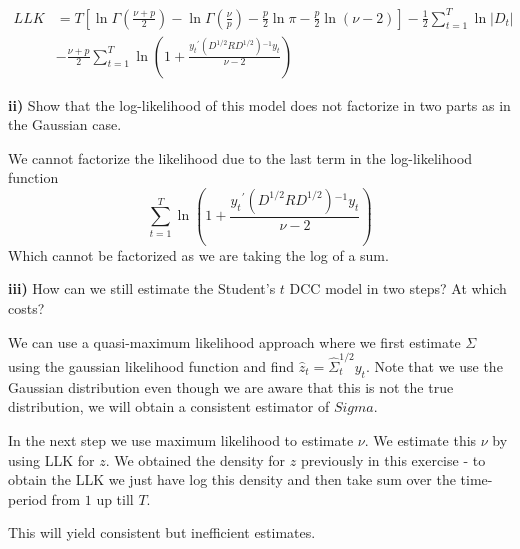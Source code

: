 \documentclass{article}
\begin{document}
\begin{align*}
    LLK&=T\left[\ln\Gamma\left(\frac{\nu+p}{2}\right)-\ln\Gamma\left(\frac{\nu}{p}\right)-\frac{p}{2}\ln\pi-\frac{p}{2}\ln\left(\nu-2\right)\right]-\frac{1}{2}\sum_{t=1}^{T}\ln\left|D_{t}\right|\\
	&-\frac{\nu+p}{2}\sum_{t=1}^{T}\ln\left(1+\frac{y_{t}{}^{\prime}\left(D^{1/2}RD^{1/2}\right){}^{-1}y_{t}}{\nu-2}\right)
\end{align*}

\begin{tcolorbox}[colback=white]
	\textbf{ii)} Show that the log-likelihood of this model does not factorize in two parts as in the Gaussian case.
\end{tcolorbox}
We cannot factorize the likelihood due to the last term in the log-likelihood function 
$$\sum_{t=1}^{T}\ln\left(1+\frac{y_{t}{}^{\prime}\left(D^{1/2}RD^{1/2}\right){}^{-1}y_{t}}{\nu-2}\right)$$ Which cannot be factorized as we are taking the log of a sum.


\begin{tcolorbox}[colback=white]
	\textbf{iii)} How can we still estimate the Student's $t$ DCC model in two steps? At which costs? 
\end{tcolorbox}

We can use a quasi-maximum likelihood approach where we first estimate $\Sigma$ using 
the gaussian likelihood function and find $\widehat{z}_{t}=\widehat{\Sigma}_{t}^{1/2}y_{t}$. 
Note that we use the Gaussian distribution even though we are aware that this is not the true distribution, we will obtain a consistent estimator of $Sigma$. 

In the next step we use maximum likelihood to estimate $\nu$. 
We estimate this $\nu$ by using LLK for $z$. We obtained the density for $z$ previously in this exercise - to obtain the LLK we just have log this density and then take sum over the time-period from $1$ up till $T$. 


This will yield consistent but inefficient estimates.
\end{document}
